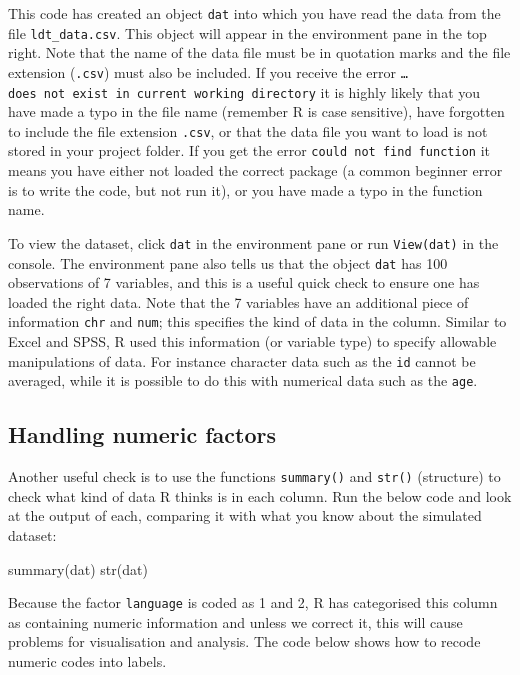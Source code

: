 \documentclass[
  english,
  doc,floatsintext]{apa6}
\newenvironment{Shaded}{\begin{snugshade}}{\end{snugshade}}
\newcommand{\FunctionTok}[1]{\textcolor[rgb]{0.00,0.00,0.00}{#1}}
\newcommand{\NormalTok}[1]{#1}
\begin{document}
This code has created an object \texttt{dat} into which you have read the data from the file \texttt{ldt\_data.csv}. This object will appear in the environment pane in the top right. Note that the name of the data file must be in quotation marks and the file extension (\texttt{.csv}) must also be included. If you receive the error \texttt{\ldots{}does\ not\ exist\ in\ current\ working\ directory} it is highly likely that you have made a typo in the file name (remember R is case sensitive), have forgotten to include the file extension \texttt{.csv}, or that the data file you want to load is not stored in your project folder. If you get the error \texttt{could\ not\ find\ function} it means you have either not loaded the correct package (a common beginner error is to write the code, but not run it), or you have made a typo in the function name.

To view the dataset, click \texttt{dat} in the environment pane or run \texttt{View(dat)} in the console. The environment pane also tells us that the object \texttt{dat} has 100 observations of 7 variables, and this is a useful quick check to ensure one has loaded the right data. Note that the 7 variables have an additional piece of information \texttt{chr} and \texttt{num}; this specifies the kind of data in the column. Similar to Excel and SPSS, R used this information (or variable type) to specify allowable manipulations of data. For instance character data such as the \texttt{id} cannot be averaged, while it is possible to do this with numerical data such as the \texttt{age}.

\hypertarget{handling-numeric-factors}{%
\subsection{Handling numeric factors}\label{handling-numeric-factors}}

Another useful check is to use the functions \texttt{summary()} and \texttt{str()} (structure) to check what kind of data R thinks is in each column. Run the below code and look at the output of each, comparing it with what you know about the simulated dataset:

\begin{Shaded}
\begin{Highlighting}[]
\FunctionTok{summary}\NormalTok{(dat)}
\FunctionTok{str}\NormalTok{(dat)        }
\end{Highlighting}
\end{Shaded}

Because the factor \texttt{language} is coded as 1 and 2, R has categorised this column as containing numeric information and unless we correct it, this will cause problems for visualisation and analysis. The code below shows how to recode numeric codes into labels.
\end{document}
